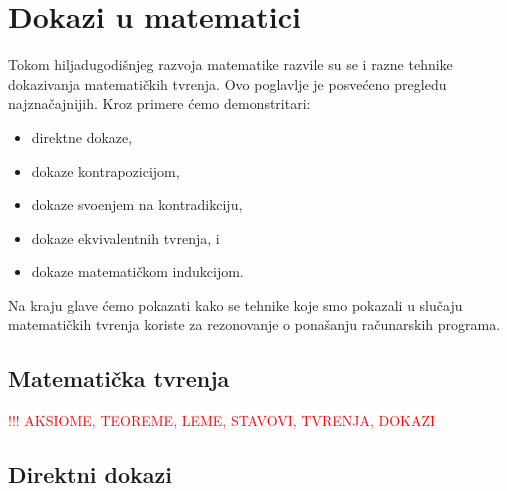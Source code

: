 \chapter{Dokazi u matematici}

Tokom hiljadugodi\v snjeg razvoja matematike razvile su se i razne tehnike dokazivanja matemati\v ckih tvr\dj enja.
Ovo poglavlje je posve\'ceno pregledu najzna\v cajnijih. Kroz primere \'cemo demonstritari:
\begin{itemize}\itemsep -1pt
\item direktne dokaze,
\item dokaze kontrapozicijom,
\item dokaze svo\dj enjem na kontradikciju,
\item dokaze ekvivalentnih tvr\dj enja, i
\item dokaze matemati\v ckom indukcijom.
\end{itemize}
Na kraju glave \'cemo pokazati kako se tehnike koje smo pokazali u slu\v caju matemati\v ckih tvr\dj enja koriste
za rezonovanje o pona\v sanju ra\v cunarskih programa.

\section{Matemati\v cka tvr\dj enja}


\textcolor{red}{!!!   AKSIOME, TEOREME, LEME, STAVOVI, TVR\Dj ENJA, DOKAZI}


\section{Direktni dokazi}

